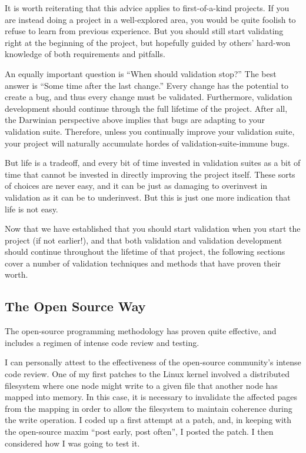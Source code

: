 It is worth reiterating that this advice applies to first-of-a-kind
projects.
If you are instead doing a project in a well-explored area, you would
be quite foolish to refuse to learn from previous experience.
But you should still start validating right at the beginning of the
project, but hopefully guided by others' hard-won knowledge of both
requirements and pitfalls.

An equally important question is ``When should validation stop?''
The best answer is ``Some time after the last change.''
Every change has the potential to create a bug, and thus every
change must be validated.
Furthermore, validation development should continue through the
full lifetime of the project.
After all, the Darwinian perspective above implies that bugs are
adapting to your validation suite.
Therefore, unless you continually improve your validation suite, your
project will naturally accumulate hordes of validation-suite-immune bugs.

But life is a tradeoff, and every bit of time invested in validation
suites as a bit of time that cannot be invested in directly improving
the project itself.
These sorts of choices are never easy, and it can be just as damaging
to overinvest in validation as it can be to underinvest.
But this is just one more indication that life is not easy.

Now that we have established that you should start validation when
you start the project (if not earlier!), and that both validation and
validation development should continue throughout the lifetime of that
project, the following sections cover a number of validation techniques
and methods that have proven their worth.

\subsection{The Open Source Way}
\label{sec:debugging:The Open Source Way}

The open-source programming methodology has proven quite effective, and
includes a regimen of intense code review and testing.

I can personally attest to the effectiveness of the open-source community's
intense code review.
One of my first patches to the Linux kernel involved a distributed
filesystem where one node might write to a given file that another node
has mapped into memory.
In this case, it is necessary to invalidate the affected pages from
the mapping in order to allow the filesystem to maintain coherence
during the write operation.
I coded up a first attempt at a patch, and, in keeping with the open-source
maxim ``post early, post often'', I posted the patch.
I then considered how I was going to test it.

